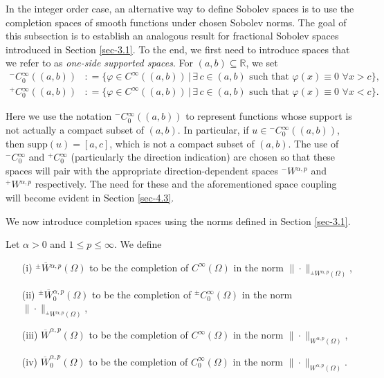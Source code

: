 \documentclass[leqno,final]{siamltex}
\numberwithin{equation}{section}
\renewcommand{\(}{\bigl(}
\renewcommand{\)}{\bigr)}
\newcommand{\R}{\mathbb{R}}
\begin{document}
    In the integer order case, an alternative way to define Sobolev spaces is 
    to use the completion spaces of smooth functions under chosen Sobolev norms. 
    The goal of this subsection is to establish an analogous result for fractional Sobolev spaces
    introduced in Section \ref{sec-3.1}. To the end,  we first need to introduce spaces 
    that we refer to as \textit{one-side supported spaces}.
    For $(a,b) \subseteq \R$, we set 
    	\begin{align*}
    	{^{-}}{C}{^{\infty}_{0}}((a,b)) &: = \{ \varphi \in C^{\infty}((a,b)) \, | \,\exists\, c \in (a,b) \mbox{ such that } \varphi(x) \equiv 0\,\, \forall x > c\},\\
    	{^{+}}{C}{^{\infty}_{0}}((a,b)) &: = \{ \varphi \in C^{\infty}((a,b)) \, | \,\exists\, c \in (a,b)  \mbox{ such that }  \varphi(x) \equiv 0  \,\,\forall x < c\}.
    	\end{align*}
    
        Here we use the notation ${^{-}}{C}{^{\infty}_{0}}((a,b))$ to represent functions whose support is not actually a compact subset of $(a,b)$. In particular, if $u \in {^{-}}{C}{^{\infty}_{0}}((a,b))$, then $\mbox{supp}(u) = [a,c]$, which is not a compact subset of $(a,b)$. %
        The use of ${^{-}}{C}{^{\infty}_{0}}$ and ${^{+}}{C}{^{\infty}_{0}}$ (particularly the direction indication) are chosen so that these spaces will pair with the appropriate direction-dependent spaces ${^{-}}{W}{^{\alpha,p}}$ and ${^{+}}{W}{^{\alpha,p}}$ respectively. The need for these and the aforementioned space coupling will become 
        evident in Section \ref{sec-4.3}.
    
    We now introduce completion spaces using the norms defined in Section \ref{sec-3.1}.
    
    \begin{definition}\label{completionspaces}
    	Let $ \alpha >0$ and $1 \leq p \leq \infty$.  We define 
    	\begin{itemize}
    		\item[(i)] ${^{\pm}}{\overline{W}}{^{\alpha,p}}(\Omega)$ to be the completion of $C^{\infty}(\Omega)$ in the norm $\|\cdot\|_{{^{\pm}}{W}{^{\alpha,p}}(\Omega)}$,
    		\item[(ii)] ${^{\pm}}{\overline{W}}{^{\alpha,p}_{0}}(\Omega)$ to be  the completion of ${^{\pm}}{C}{^{\infty}_{0}}(\Omega)$ in the norm $\|\cdot \|_{{^{\pm}}{W}{^{\alpha,p}}(\Omega)}$,
    		\item[(iii)] $ {\overline{ {W}}^{\alpha,p}(\Omega)}$ to be the completion of $C^{\infty}(\Omega)$ in the  norm $\|\cdot\|_{{ {W}^{\alpha,p}(\Omega)}}$,
    		\item[(iv)] $\overline{{W}}^{\alpha,p}_{0}(\Omega)$ to be  the completion of $C^{\infty}_{0}(\Omega)$ in the  norm $\|\cdot\|_{ {W}^{\alpha,p}(\Omega)}$.
    	\end{itemize}
    \end{definition} 
\end{document}
